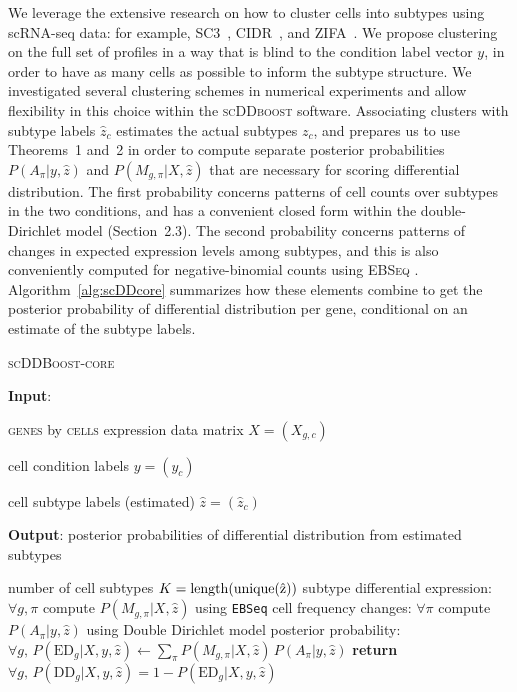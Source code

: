 \documentclass[aoas,preprint]{imsart}
\begin{document}
We leverage the extensive research on how to cluster cells into subtypes using scRNA-seq data:
for example,  SC3~\citep{sc3}, CIDR~\citep{CIDR}, and ZIFA~\citep{ZIFA}.   We propose clustering on the full set
of profiles in a way that is blind to the condition label vector $y$, in order to have as many cells as possible
to inform the subtype structure.  We investigated several clustering schemes in numerical experiments and allow 
flexibility in this choice within the \textsc{scDDboost} software. 
Associating clusters with subtype labels $\hat z_c$  estimates
the actual subtypes $z_c$, and prepares us to use Theorems~1 and~2 in order to compute separate
posterior probabilities $P(A_\pi|y, \hat z)$ and $P(M_{g, \pi}| X, \hat z)$ that are necessary for scoring
differential distribution. The first probability concerns patterns of cell counts over subtypes in the two conditions,
and has a convenient closed form within the double-Dirichlet model (Section~2.3).
The second probability concerns patterns of changes in expected expression levels among subtypes, and this is
also conveniently computed for negative-binomial counts using \textsc{EBSeq} \citep{ref:Leng}. 
Algorithm~\ref{alg:scDDcore}
summarizes how these elements combine to get the posterior probability of differential distribution per gene,
conditional on an estimate of the subtype labels.


\begin{algorithm}
\caption{\textsc{scDDBoost-core}}\label{alg:scDDcore}
\raggedright\hspace*{\algorithmicindent} \textbf{Input}: \begin{list}{}{}
 \item \textsc{genes} by \textsc{cells} expression data matrix $X=(X_{g,c})$
 \item  cell condition labels $y=(y_c)$ 
 \item  cell subtype labels (estimated)  $\hat z=(\hat z_c)$
 \end{list}
\hspace*{\algorithmicindent} 
\textbf{Output}:  posterior probabilities of differential distribution from estimated subtypes
\begin{algorithmic}[1]
 \item  number of cell subtypes $K = \rm{length}( \rm{unique}( \hat z ) )$  
\State subtype differential expression: $\forall g,\pi$ compute  $P(M_{g,\pi} | X, \hat z)$ using \verb+EBSeq+
\State cell frequency changes: $\forall \pi$ compute  $P(A_\pi | y, \hat z)$ using Double Dirichlet model 
\State posterior probability: $\forall g,  \, P(\text{ED}_g | X, y, \hat z)\gets \underset{\pi}{\sum}P(M_{g,\pi} | X, \hat z) \,
 P(A_\pi | y, \hat z)$
\State \textbf{return} $\forall g, \, P(\text{DD}_g |X, y, \hat z)=1-P(\text{ED}_g| X,y, \hat z)$
\EndProcedure
\end{algorithmic}
\end{algorithm}
\end{document}
